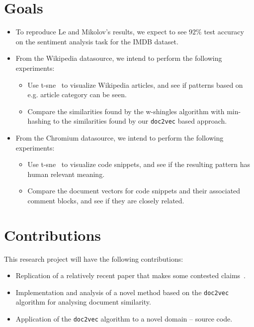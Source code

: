 \documentclass[11pt]{article}
\begin{document}
\section*{Goals}
  \begin{itemize}
    \item To reproduce Le and Mikolov's results, we expect to see $92\%$ test
          accuracy ~\cite{le2014distributed} on the sentiment analysis task for
          the IMDB dataset.
    \item From the Wikipedia datasource, we intend to perform the following
          experiments:
          \begin{itemize}
            \item Use t-sne~\cite{maaten2008visualizing} to visualize Wikipedia
                  articles, and see if patterns based on e.g. article category
                  can be seen.
            \item Compare the similarities found by the w-shingles algorithm
                  with min-hashing to the similarities found by our
                  \texttt{doc2vec} based approach.
          \end{itemize}
    \item From the Chromium datasource, we intend to perform the following
          experiments:
          \begin{itemize}
            \item Use t-sne~\cite{maaten2008visualizing} to visualize code
                  snippets, and see if the resulting pattern has human
                  relevant meaning.
            \item Compare the document vectors for code snippets and their
                  associated comment blocks, and see if they are closely
                  related.
          \end{itemize}
  \end{itemize}
\section*{Contributions}
This research project will have the following contributions:
\begin{itemize}
  \item Replication of a relatively recent paper that makes some contested
        claims~\cite{googlegroups2015}.
  \item Implementation and analysis of a novel method based on the
        \texttt{doc2vec} algorithm for analysing document similarity.
  \item Application of the \texttt{doc2vec} algorithm to a novel
        domain -- source code.
\end{itemize}

\printbibliography
\end{document}
